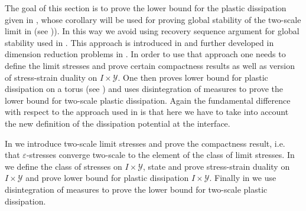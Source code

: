 \documentclass[reqno,10pt]{amsart}
\numberwithin{equation}{section}
\theoremstyle{remark}
\newcommand{\calY}{\mathcal{Y}}
\newcommand{\eps}{\varepsilon}
\begin{document}
The goal of this section is to prove the lower bound for the plastic dissipation given in , whose corollary will be used for proving global stability of the two-scale limit in  (see )).
In this way we avoid using recovery sequence argument for global stability used in \cite{Davoli.Mora.2013}.
This approach is introduced in \cite{Francfort.Giacomini.2014} and further developed in dimension reduction problems in \cite{Buzancic.Davoli.Velcic.2024.1st,Buzancic.Davoli.Velcic.2024.2nd}.
In order to use that approach one needs to define the limit stresses and prove certain compactness results as well as version of stress-strain duality on $I \times \calY$.
One then proves lower bound for plastic dissipation on a torus (see ) and uses disintegration of measures to prove the lower bound for two-scale plastic dissipation.
Again the fundamental difference with respect to the approach used in \cite{Buzancic.Davoli.Velcic.2024.2nd} is that here we have to take into account the new definition of the dissipation potential at the interface. 

In  we introduce two-scale limit stresses and prove the compactness result, i.e. that $\eps$-stresses converge two-scale to the element of the class of limit stresses. 
In  we define the class of stresses on $I \times \calY$, state and prove stress-strain duality on $I \times \calY$ and prove lower bound for plastic dissipation $I \times \calY$. Finally in  we use disintegration of measures to prove the lower bound for two-scale plastic dissipation.
\end{document}
